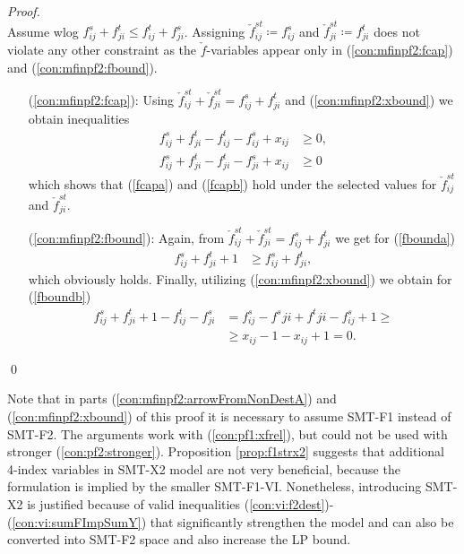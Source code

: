 \begin{proof}
$$$$
Assume wlog $f^s_{ij} + f^t_{ji}\leq f^t_{ij} + f^s_{ji}$. Assigning $\check{f}^{st}_{ij}\coloneqq f^s_{ij}$ and $\check{f}^{st}_{ji}\coloneqq f^t_{ji}$ does not violate any other constraint as the $\check{f}$-variables appear only in (\ref{con:mfinpf2:fcap}) and (\ref{con:mfinpf2:fbound}).
\begin{itemize}[leftmargin=1cm]
\item[(\ref{con:mfinpf2:fcap}):]  Using $\check{f}^{st}_{ij} + \check{f}^{st}_{ji} = f^{s}_{ij} + f^{t}_{ji}$ and (\ref{con:mfinpf2:xbound}) we obtain inequalities
\begin{align*}
f^{s}_{ij} + f^{t}_{ji}-f^t_{ij}-f^s_{ij}+x_{ij}&\geq 0,\\
f^{s}_{ij} + f^{t}_{ji}-f^t_{ji}-f^s_{ji}+x_{ij}&\geq 0
\end{align*}
which shows that (\ref{fcapa}) and (\ref{fcapb}) hold under the selected values for $\check{f}^{st}_{ij}$ and $\check{f}^{st}_{ji}$.
\item[(\ref{con:mfinpf2:fbound}):] Again, from $\check{f}^{st}_{ij} + \check{f}^{st}_{ji} = f^{s}_{ij} + f^{t}_{ji}$  we get for (\ref{fbounda})
\begin{align*}
f^{s}_{ij} + f^{t}_{ji} + 1 &\geq f^s_{ij}+f^t_{ji},
\end{align*}
which obviously holds. Finally, utilizing (\ref{con:mfinpf2:xbound}) we obtain for (\ref{fboundb})
\begin{align*}
f^{s}_{ij} + f^{t}_{ji} + 1 -f^t_{ij}-f^s_{ji} &
= f^s_{ij}-f^s{ji}+f^t{ji}-f^s_{ij}+1 \geq \\
&\geq x_{ij}-1-x_{ij}+1=0.
\end{align*}
\end{itemize}\qed
\end{proof} 
Note that in parts (\ref{con:mfinpf2:arrowFromNonDestA}) and (\ref{con:mfinpf2:xbound}) of this proof it is necessary to assume SMT-F1 instead of SMT-F2. The arguments work with (\ref{con:pf1:xfrel}), but could not be used with stronger (\ref{con:pf2:stronger}).
Proposition \ref{prop:f1strx2} suggests that additional 4-index variables in SMT-X2 model are not very beneficial, because the formulation is implied by the smaller SMT-F1-VI. Nonetheless, introducing SMT-X2 is justified because of valid inequalities (\ref{con:vi:f2dest})-(\ref{con:vi:sumFImpSumY}) that significantly strengthen the model and can also be converted into SMT-F2 space and also increase the LP bound.
